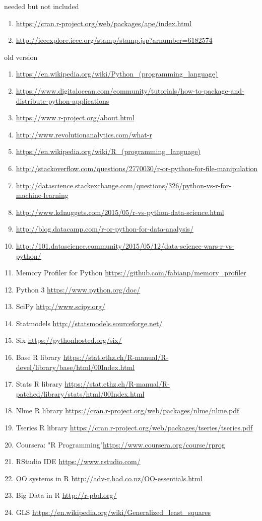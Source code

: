 \documentclass [twoside,
  11pt, a4paper,
  footinclude=true,
  headinclude=true,
  cleardoublepage=empty
]{article}
\begin{document}
needed but not included
\begin{enumerate}

    \item \url{https://cran.r-project.org/web/packages/ape/index.html}
    \item \url{http://ieeexplore.ieee.org/stamp/stamp.jsp?arnumber=6182574}
\end{enumerate}
old version
\begin{enumerate}
    \item \url{https://en.wikipedia.org/wiki/Python_(programming_language)}
    \item \url{https://www.digitalocean.com/community/tutorials/how-to-package-and-distribute-python-applications}
    \item \url{https://www.r-project.org/about.html}
    \item \url{http://www.revolutionanalytics.com/what-r}
    \item \url{https://en.wikipedia.org/wiki/R_(programming_language)}
    \item \url{http://stackoverflow.com/questions/2770030/r-or-python-for-file-manipulation}
    \item \url{http://datascience.stackexchange.com/questions/326/python-vs-r-for-machine-learning}
    \item \url{http://www.kdnuggets.com/2015/05/r-vs-python-data-science.html}
    \item \url{http://blog.datacamp.com/r-or-python-for-data-analysis/}
    \item \url{http://101.datascience.community/2015/05/12/data-science-wars-r-vs-python/}
    \item Memory Profiler for Python \url{https://github.com/fabianp/memory_profiler} 
    \item Python 3 \url{https://www.python.org/doc/}
    \item SciPy \url{http://www.scipy.org/}
    \item Statmodels \url{http://statsmodels.sourceforge.net/}
    \item Six \url{https://pythonhosted.org/six/}
    \item Base R library \url{https://stat.ethz.ch/R-manual/R-devel/library/base/html/00Index.html}
    \item Stats R library \url{https://stat.ethz.ch/R-manual/R-patched/library/stats/html/00Index.html}
    \item Nlme R library \url{https://cran.r-project.org/web/packages/nlme/nlme.pdf}
    \item Tseries R library \url{https://cran.r-project.org/web/packages/tseries/tseries.pdf}
    \item Coursera: "R Programming"\url{https://www.coursera.org/course/rprog}
    \item RStudio IDE \url{https://www.rstudio.com/}
    \item OO systems in R \url{http://adv-r.had.co.nz/OO-essentials.html}
    \item Big Data in R \url{http://r-pbd.org/}
    \item GLS \url{https://en.wikipedia.org/wiki/Generalized_least_squares}
\end{enumerate}
\end{document}
